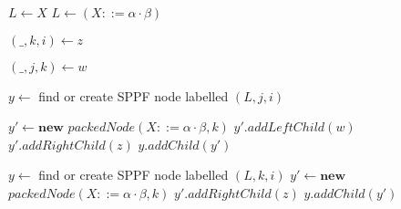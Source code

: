 \begin{algorithmic}   
    \State {}
    \Else
    
    \If{($\beta = \varepsilon$)}
    \State $L \gets X$
    \Else
    \State $L \gets (X ::=\alpha \cdot \beta)$
    \EndIf
    
    \State $(\_, k, i) \gets z$
    
    \State $(\_, j, k) \gets w$
    
    \State $y \gets$ find or create SPPF node labelled $(L, j, i)$  
    
    \State $y\prime \gets \textbf{new}$ $packedNode(X ::=\alpha \cdot \beta, k)$
    \State $y\prime.addLeftChild(w)$
    \State $y\prime.addRightChild(z)$
    \State $y.addChild(y\prime)$
    \EndIf
    
    \Else
    \State $y \gets$ find or create SPPF node labelled $(L, k, i)$ 
    \State $y\prime \gets \textbf{new}$ $packedNode(X ::=\alpha \cdot \beta, k)$
    \State $y\prime.addRightChild(z)$
    \State $y.addChild(y\prime)$
    \EndIf
    
    \EndIf
    
    \State {}
    \EndIf
    \EndFunction
\end{algorithmic}


